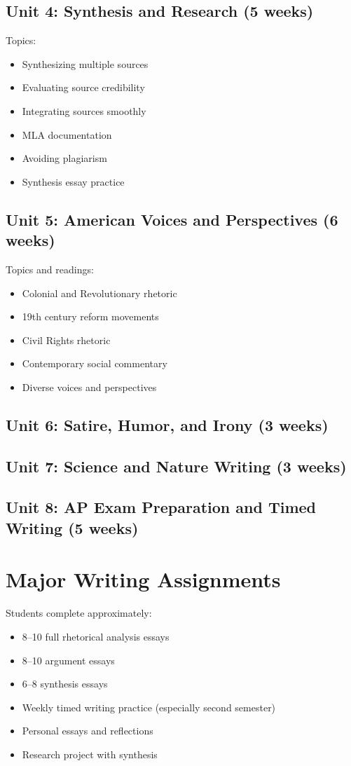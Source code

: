 \documentclass[12pt,oneside]{book}
\begin{document}
\subsection*{Unit 4: Synthesis and Research (5 weeks)}
Topics:
\begin{itemize}[leftmargin=2em]
    \item Synthesizing multiple sources
    \item Evaluating source credibility
    \item Integrating sources smoothly
    \item MLA documentation
    \item Avoiding plagiarism
    \item Synthesis essay practice
\end{itemize}

\subsection*{Unit 5: American Voices and Perspectives (6 weeks)}
Topics and readings:
\begin{itemize}[leftmargin=2em]
    \item Colonial and Revolutionary rhetoric
    \item 19th century reform movements
    \item Civil Rights rhetoric
    \item Contemporary social commentary
    \item Diverse voices and perspectives
\end{itemize}

\subsection*{Unit 6: Satire, Humor, and Irony (3 weeks)}
\subsection*{Unit 7: Science and Nature Writing (3 weeks)}
\subsection*{Unit 8: AP Exam Preparation and Timed Writing (5 weeks)}

\section{Major Writing Assignments}
Students complete approximately:
\begin{itemize}[leftmargin=2em]
    \item 8--10 full rhetorical analysis essays
    \item 8--10 argument essays
    \item 6--8 synthesis essays
    \item Weekly timed writing practice (especially second semester)
    \item Personal essays and reflections
    \item Research project with synthesis
\end{itemize}
\end{document}
